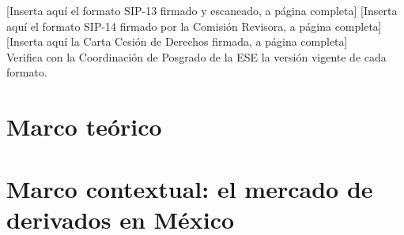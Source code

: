 \documentclass[12pt,letterpaper,oneside]{report}
\begin{document}


\setcounter{page}{2}

% 
  {[Inserta aquí el formato SIP-13 firmado y escaneado, a página completa]}
  {[Inserta aquí el formato SIP-14 firmado por la Comisión Revisora, a página completa]}
  {[Inserta aquí la Carta Cesión de Derechos firmada, a página completa]\\[6pt]
   Verifica con la Coordinación de Posgrado de la ESE la versión vigente de cada formato.}





\clearpage
{\tableofcontents}

\clearpage{}
{}
\listoftables

\clearpage{}
{}
\listoffigures











\clearpage
{}

\chapter{Marco teórico}


\chapter{Marco contextual: el mercado de derivados en México}

\end{document}
